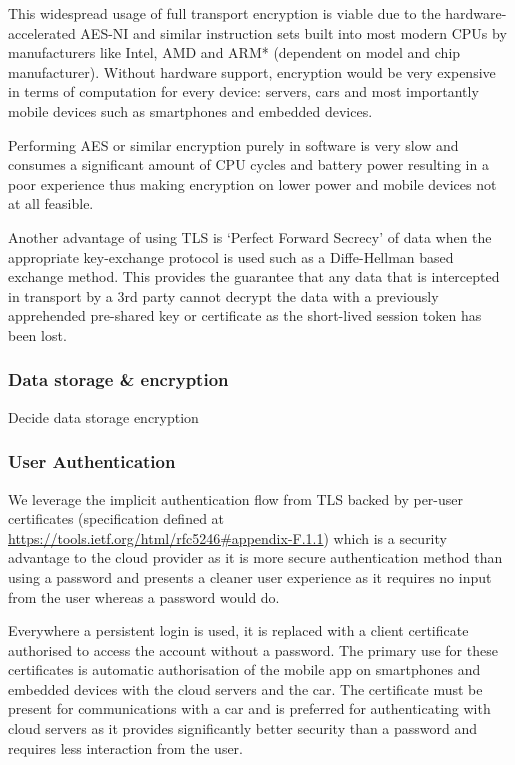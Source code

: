 \documentclass{article}
\begin{document}
This widespread usage of full transport encryption is viable due to the hardware-accelerated AES-NI and similar instruction sets built into most modern CPUs by manufacturers like Intel, AMD and ARM* (dependent on model and chip manufacturer). Without hardware support, encryption would be very expensive in terms of computation for every device: servers, cars and most importantly mobile devices such as smartphones and embedded devices.

Performing AES or similar encryption purely in software is very slow and consumes a significant amount of CPU cycles and battery power resulting in a poor experience thus making encryption on lower power and mobile devices not at all feasible.

Another advantage of using TLS is `Perfect Forward Secrecy' of data when the appropriate key-exchange protocol is used such as a Diffe-Hellman based exchange method. This provides the guarantee that any data that is intercepted in transport by a 3rd party cannot decrypt the data with a previously apprehended pre-shared key or certificate as the short-lived session token has been lost.

\subsubsection{Data storage \& encryption}
{\Large\color{red} Decide data storage encryption}

\subsubsection{User Authentication}
We leverage the implicit authentication flow from TLS backed by per-user certificates (specification defined at \url{https://tools.ietf.org/html/rfc5246#appendix-F.1.1}) which is a security advantage to the cloud provider  as it is more secure authentication method than using a password and presents a cleaner user experience as it requires no input from the user whereas a password would do.

Everywhere a persistent login is used, it is replaced with a client certificate authorised to access the account without a password. The primary use for these certificates is automatic authorisation of the mobile app on smartphones and embedded devices with the cloud servers and the car. The certificate must be present for communications with a car and is preferred for authenticating with cloud servers as it provides significantly better security than a password and requires less interaction from the user.
\end{document}
